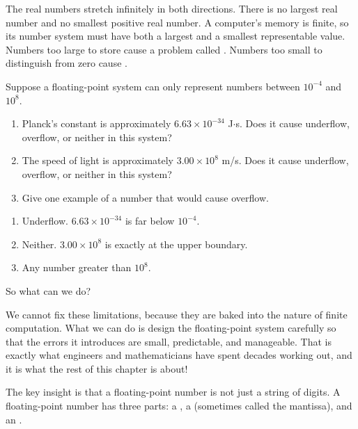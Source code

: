 The real numbers stretch infinitely in both directions. There is no largest real number
and no smallest positive real number. A computer's memory is finite, so its number system must have both a largest and a smallest representable value. Numbers too large to store cause a problem called . Numbers too small to distinguish from zero cause . 



\begin{Exercise}[title={Overflow and Underflow}, label={ex:overflow}]
Suppose a floating-point system can only represent numbers between $10^{-4}$ and $10^{8}$.
\begin{enumerate}
    \item Planck's constant is approximately $6.63 \times 10^{-34}$ J$\cdot$s. Does it
    cause underflow, overflow, or neither in this system?
    \item The speed of light is approximately $3.00 \times 10^{8}$ m/s. Does it
    cause underflow, overflow, or neither in this system?
    \item Give one example of a number that would cause overflow.
\end{enumerate}
\end{Exercise}
\begin{Answer}[ref={ex:overflow}]
\begin{enumerate}
    \item Underflow. $6.63 \times 10^{-34}$ is far below $10^{-4}$.
    \item Neither. $3.00 \times 10^{8}$ is exactly at the upper boundary.
    \item Any number greater than $10^{8}$.
\end{enumerate}
\end{Answer}


So what can we do?

We cannot fix these limitations, because they are baked into the nature of finite computation.
What we can do is design the floating-point system carefully so that the errors it introduces are small, predictable, and manageable. That is exactly what engineers and mathematicians have spent decades working out, and it is what the rest of this chapter is about!

The key insight is that a floating-point number is not just a string of digits. A floating-point number has three parts: a , a 
(sometimes called the mantissa), and an .


